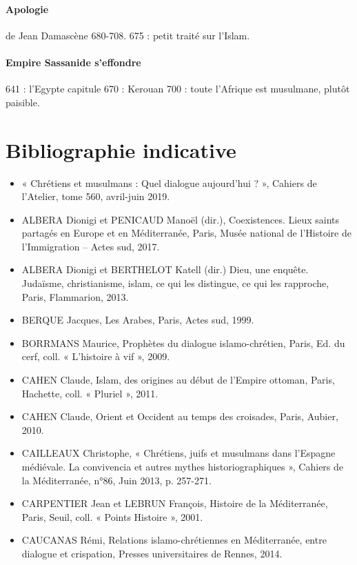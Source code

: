 \paragraph{Apologie} de Jean Damascène 680-708. 675 : petit traité sur l'Islam. 

\paragraph{Empire Sassanide s'effondre} 
641 : l'Egypte capitule
670 : Kerouan
700 : toute l'Afrique est musulmane, plutôt paisible. 


\section{Bibliographie indicative}

\begin{itemize}
    \item     « Chrétiens et musulmans : Quel dialogue aujourd'hui ? », Cahiers de l'Atelier, tome 560, avril-juin 2019.   
    \item    ALBERA Dionigi et PENICAUD Manoël (dir.), Coexistences. Lieux saints partagés en Europe et en Méditerranée, Paris, Musée national de l’Histoire de l’Immigration – Actes sud, 2017.     
    
    \item   ALBERA Dionigi et BERTHELOT Katell (dir.) Dieu, une enquête. Judaïsme, christianisme, islam, ce qui les distingue, ce qui les rapproche, Paris, Flammarion, 2013.     
    
    \item   BERQUE Jacques, Les Arabes, Paris, Actes sud, 1999.     
    \item   BORRMANS Maurice, Prophètes du dialogue islamo-chrétien, Paris, Ed. du cerf, coll. « L’histoire à vif », 2009.     
    \item   CAHEN Claude, Islam, des origines au début de l’Empire ottoman, Paris, Hachette, coll. « Pluriel », 2011. 
    
    \item CAHEN Claude, Orient et Occident au temps des croisades, Paris, Aubier, 2010.     
    
    \item   CAILLEAUX Christophe, « Chrétiens, juifs et musulmans dans l’Espagne médiévale. La convivencia et autres mythes historiographiques », Cahiers de la Méditerranée, n°86, Juin 2013, p. 257-271.     \item   CARPENTIER Jean et LEBRUN François, Histoire de la Méditerranée, Paris, Seuil, coll. « Points Histoire », 2001.     
    \item   CAUCANAS Rémi, Relations islamo-chrétiennes en Méditerranée, entre dialogue et crispation, Presses universitaires de Rennes, 2014.   




\end{itemize}

